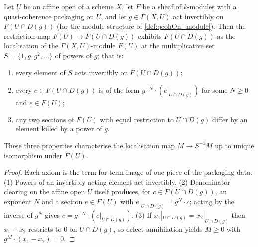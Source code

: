 \begin{theorem}
  \label{thm:qcohOn_isLocalizedModule}
  \leanok
  Let \(U\) be an affine open of a scheme \(X\), let \(F\) be a sheaf of \(k\)-modules with
  a quasi-coherence packaging on \(U\), and let \(g \in \Gamma(X, U)\) act invertibly on
  \(F(U \cap D(g))\) (for the module structure of \ref{def:qcohOn_module}). Then the
  restriction map \(F(U) \to F(U \cap D(g))\) exhibits \(F(U \cap D(g))\) as the
  localisation of the \(\Gamma(X, U)\)-module \(F(U)\) at the multiplicative set
  \(S = \{1, g, g^2, \dots\}\) of powers of \(g\); that is:
  \begin{enumerate}
    \item every element of \(S\) acts invertibly on \(F(U \cap D(g))\);
    \item every \(c \in F(U \cap D(g))\) is of the form \(g^{-N} \cdot (e|_{U \cap D(g)})\)
      for some \(N \ge 0\) and \(e \in F(U)\);
    \item any two sections of \(F(U)\) with equal restriction to \(U \cap D(g)\) differ by
      an element killed by a power of \(g\).
  \end{enumerate}
  These three properties characterise the localisation map \(M \to S^{-1}M\) up to unique
  isomorphism under \(F(U)\).
\end{theorem}
\begin{proof}
  \leanok
  Each axiom is the term-for-term image of one piece of the packaging data. (1) Powers of
  an invertibly-acting element act invertibly. (2) Denominator clearing on the affine open
  \(U\) itself produces, for \(c \in F(U \cap D(g))\), an exponent \(N\) and a section
  \(e \in F(U)\) with \(e|_{U \cap D(g)} = g^N \cdot c\); acting by the inverse of
  \(g^N\) gives \(c = g^{-N} \cdot (e|_{U \cap D(g)})\). (3) If
  \(x_1|_{U \cap D(g)} = x_2|_{U \cap D(g)}\) then \(x_1 - x_2\) restricts to \(0\) on
  \(U \cap D(g)\), so defect annihilation yields \(M \ge 0\) with
  \(g^M \cdot (x_1 - x_2) = 0\).
\end{proof}

